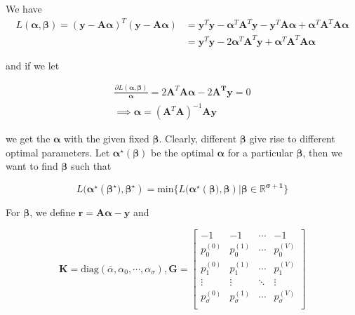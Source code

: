 We have
\begin{equation}
 \begin{split}
	L(\boldsymbol{\alpha},\boldsymbol{\beta}) 
	 =(\boldsymbol{y-A\alpha})^T(\boldsymbol{y-A\alpha}) 
	&=\boldsymbol{y}^T\boldsymbol{y}-\boldsymbol{\alpha}{^T}\boldsymbol{A}^T\boldsymbol{y}-\boldsymbol{y}^T\boldsymbol{A\alpha}+\boldsymbol{\alpha}^T\boldsymbol{A}^T\boldsymbol{A\alpha} \\
	& = \boldsymbol{y}^T\boldsymbol{y}-2\boldsymbol{\alpha}^T\boldsymbol{A}^T\boldsymbol{y}+\boldsymbol{\alpha}^T\boldsymbol{A}^T\boldsymbol{A}\boldsymbol{\alpha}
\end{split}
\end{equation}

and if we let 

\begin{equation}
\label{alpha_form}
	\begin{split}
		\frac{\partial L(\boldsymbol{\alpha}, \boldsymbol{\beta})}{\boldsymbol{\alpha}}=2\boldsymbol{A}^T\boldsymbol{A}\boldsymbol{\alpha}-2\boldsymbol{A^T}\boldsymbol{y}=0 \\ \implies 
		\boldsymbol{\alpha}=(\boldsymbol{A}^T\boldsymbol{A})^{-1}\boldsymbol{A}\boldsymbol{y}
	\end{split}
\end{equation}


we get the $\boldsymbol{\alpha}$ with the given fixed $\boldsymbol{\beta}$. Clearly, different $\boldsymbol{\beta}$ give rise to different optimal parameters. Let $\boldsymbol{\alpha^\star}(\boldsymbol{\beta})$ be the optimal $\boldsymbol{\alpha}$ for a particular $\boldsymbol{\beta}$, then we want to find $\boldsymbol{\beta}$ such that


\begin{equation}
	L(\boldsymbol{\alpha^\star}(\boldsymbol{\beta^\star)}, \boldsymbol{\beta^\star})=\text{min}\{L(\boldsymbol{\alpha^\star}(\boldsymbol{\beta)}, \boldsymbol{\beta}) | \boldsymbol{\beta\in\mathbb{R}^{\sigma+1}}\}
\end{equation}

For $\boldsymbol{\beta}$, we define $\boldsymbol{r}=\boldsymbol{A\alpha-y}$ and 

$$
\boldsymbol{K}=\text{diag}(\bar{\alpha},\alpha_0, \cdots, \alpha_\sigma), \boldsymbol{G}=\begin{bmatrix}
 -1 & -1 & \cdots & -1 \\
  p_0^{(0)} & p_0^{(1)} & \cdots & p_0^{(V)} \\
  p_1^{(0)} & p_1^{(1)} & \cdots & p_1^{(V)} \\
  \vdots & \vdots & \ddots & \vdots \\
  p_\sigma^{(0)} & p_\sigma^{(1)}& \cdots & p_\sigma^{(V)} \\
\end{bmatrix}
$$

